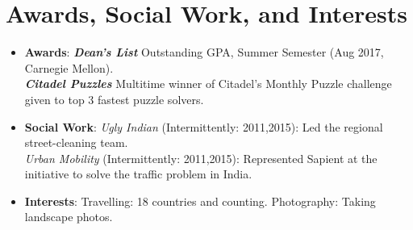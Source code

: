 \documentclass[letterpaper,10.8pt]{article}
\newcommand{\resumeItem}[2]{
  \item\small{
    \textbf{#1}{: #2 \vspace{-2pt}}
  }
}
\newcommand{\resumeItemListStart}{\begin{itemize}}
\newcommand{\resumeItemListEnd}{\end{itemize}\vspace{-5pt}}
\begin{document}
\section{Awards, Social Work, and Interests}
\resumeItemListStart
	\resumeItem{Awards}
	{\textbf{\textit{Dean's List}} Outstanding GPA, Summer Semester (Aug 2017, Carnegie Mellon).\\ \textbf{\textit{Citadel Puzzles}} Multitime winner of Citadel's Monthly Puzzle challenge given to top 3 fastest puzzle solvers.}
	\resumeItem{Social Work}{\textit{Ugly Indian} (Intermittently: 2011,2015): Led the regional street-cleaning team. \\\textit{Urban Mobility} (Intermittently: 2011,2015): Represented Sapient at the initiative to solve the traffic problem in India.}
	\resumeItem{Interests}{Travelling: 18 countries and counting. Photography: Taking landscape photos.}
	\resumeItemListEnd
\end{document}
